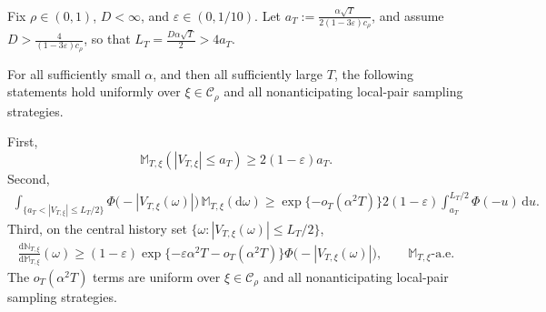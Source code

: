 \documentclass[10pt]{article}
\newcommand{\dd}{\mathrm{d}}
\theoremstyle{plain}
\begin{document}
\begin{lemma}
\label{lem:local-likelihood-curve-transfer-lower}
Fix $\rho\in(0,1)$, $D<\infty$, and
$\varepsilon\in(0,1/10)$. Let
    $a_T
    :=
    \frac{\alpha\sqrt T}
         {2(1-3\varepsilon)c_\rho}$,
and assume
    $D>
    \frac{4}{(1-3\varepsilon)c_\rho}$,
so that
    $L_T
    =
    \frac{D\alpha\sqrt T}{2}
    >
    4a_T$.

For all sufficiently small $\alpha$, and then all sufficiently large $T$,
the following statements hold uniformly over
$\xi\in\mathcal C_\rho$ and all nonanticipating local-pair sampling
strategies.

First,
\begin{equation}
\label{eq:local-mass-transfer-lower}
    \mathbb M_{T,\xi}
    \left(
        |V_{T,\xi}|\le a_T
    \right)
    \ge
    2(1-\varepsilon)a_T.
\end{equation}
Second,
\begin{equation}
\label{eq:local-weight-transfer-lower}
\begin{aligned}
    \int_{\{a_T<|V_{T,\xi}|\le L_T/2\}}
        \Phi\bigl(-|V_{T,\xi}(\omega)|\bigr)
    \,\mathbb M_{T,\xi}(\dd\omega)
    \ge
    \exp\{-o_T(\alpha^2T)\}
    2(1-\varepsilon)
    \int_{a_T}^{L_T/2}
        \Phi(-u)
    \,\dd u.
\end{aligned}
\end{equation}
Third, on the central history set
$\{\omega : |V_{T,\xi}(\omega)|\le L_T/2\}$,
\begin{equation}
\label{eq:local-overlap-transfer-lower}
\begin{aligned}
    \frac{\dd\mathbb N_{T,\xi}}
         {\dd\mathbb M_{T,\xi}}(\omega)
    \ge
    (1-\varepsilon)
    \exp\{
        -\varepsilon\alpha^2T
        -o_T(\alpha^2T)
    \}
    \Phi\bigl(-|V_{T,\xi}(\omega)|\bigr),
    \qquad
    \mathbb M_{T,\xi}\text{-a.e.}
\end{aligned}
\end{equation}
The $o_T(\alpha^2T)$ terms are uniform over
$\xi\in\mathcal C_\rho$ and all nonanticipating local-pair sampling
strategies.
\end{lemma}
\end{document}
